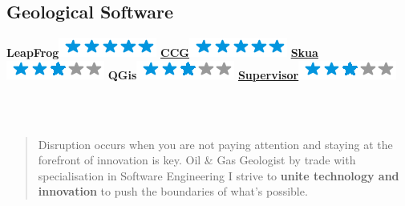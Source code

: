 \documentclass[]{friggeri-cv}
\begin{document}
\begin{aside}
  \section{Geological Software}
	\textbf{LeapFrog}\includegraphics[scale=0.40]{img/5stars.png}
	\href{http://www.ccgalberta.com/}{\textbf{CCG}}\includegraphics[scale=0.40]{img/5stars.png}
	\href{http://www.pdgm.com/products/skua-gocad/}{\textbf{Skua}}\includegraphics[scale=0.40]{img/3stars.png}
	\textbf{QGis}\includegraphics[scale=0.40]{img/3stars.png}
	\href{https://snowdengroup.com/software/supervisor/}{\textbf{Supervisor}}\includegraphics[scale=0.40]{img/3stars.png}
	~
    ~
\end{aside}
~
\begin{quote}
\large	
Disruption occurs when you are not paying attention and staying at the forefront of innovation is key. Oil \& Gas Geologist by trade with specialisation in Software Engineering I strive to \textbf{unite technology and innovation} to push the boundaries of what’s possible.
\end{quote}
\end{document}
